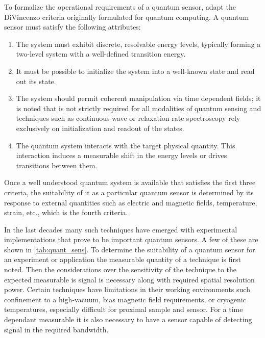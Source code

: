To formalize the operational requirements of a quantum sensor, \citeauthor*{degenQuantumSensing2017} adapt the DiVincenzo criteria\cite{divincenzoPhysicalImplementationQuantum2000} originally formulated for quantum computing. A quantum sensor must satisfy the following attributes:
\begin{enumerate}
    \item The system must exhibit discrete, resolvable energy levels, typically forming a two-level system with a well-defined transition energy.
    \item It must be possible to initialize the system into a well-known state and read out its state.
    \item The system should permit coherent manipulation via time dependent fields; it is noted that is not strictly required for all modalities of quantum sensing and techniques such as continuous-wave or relaxation rate spectroscopy rely exclusively on initialization and readout of the states.
    \item The quantum system interacts with the target physical quantity. This interaction induces a measurable shift in the energy levels or drives transitions between them.
\end{enumerate}

Once a well understood quantum system is available that satisfies the first three criteria, the suitability of it as a particular quantum sensor is determined by its response to external quantities such as electric and magnetic fields, temperature, strain, etc., which is the fourth criteria.

In the last decades many such techniques have emerged with experimental implementations that prove to be important quantum sensors. A few of these are shown in \cref{tab:quant_sens}. To determine the suitability of a quantum sensor for an experiment or application the measurable quantity of a technique is first noted. Then the considerations over the sensitivity of the technique to the expected measurable is signal is necessary along with required spatial resolution power. Certain techniques have limitations in their working environments such confinement to a high-vacuum, bias magnetic field requirements, or cryogenic temperatures, especially difficult for proximal sample and sensor. For a time dependant measurable it is also necessary to have a sensor capable of detecting signal in the required bandwidth.

